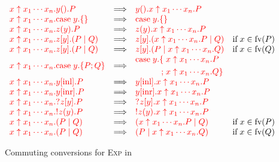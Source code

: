 \begin{figure*}
  \centering
  \(
    \begin{array}{lclr}
      \red{ \expn{x}{x_1 \cdots x_n}\wait{y}P }
      &\Longrightarrow&
      \red{ \wait{y}\expn{x}{x_1 \cdots x_n}P }
      \\
      \red{ \expn{x}{x_1\cdots x_n}\case{y}{}{} }
      &\Longrightarrow&
      \red{ \case{y}{}{} }
      \\
      \red{ \expn{x}{x_1 \cdots x_n}\recv{z}{y}P }
      &\Longrightarrow&
      \red{ \recv{z}{y}\expn{x}{x_1 \cdots x_n}P }
      \\
      \red{ \expn{x}{x_1 \cdots x_n}\send{z}{y}(P \mid Q) }
      &\Longrightarrow&
      \red{ \send{z}{y}(\expn{x}{x_1 \cdots x_n}P \mid Q) }
      &\text{if} \; x \in \text{fv}(P)
      \\
      \red{ \expn{x}{x_1 \cdots x_n}\send{z}{y}(P \mid Q) }
      &\Longrightarrow&
      \red{ \send{z}{y}(P \mid \expn{x}{x_1 \cdots x_n}Q) }
      &\text{if} \; x \in \text{fv}(Q) 
      \\
      \red{ \expn{x}{x_1 \cdots x_n}\case{y}{P}{Q} }
      &\Longrightarrow&
      \!\begin{aligned}
        \red{ \text{case}\;y.}
        \red{ \{\;}& \red{\expn{x}{x_1 \cdots x_n}P}\\
        \red{  ;\;}& \red{\expn{x}{x_1 \cdots x_n}Q\}}
      \end{aligned}
      \\
      \red{ \expn{x}{x_1 \cdots x_n}\inl{y}P }
      &\Longrightarrow&
      \red{ \inl{y}\expn{x}{x_1 \cdots x_n}P }
      \\
      \red{ \expn{x}{x_1 \cdots x_n}\inr{y}P }
      &\Longrightarrow&
      \red{ \inr{y}\expn{x}{x_1 \cdots x_n}P }
      \\
      \red{ \expn{x}{x_1 \cdots x_n}\give{\send{z}{y}}P }
      &\Longrightarrow&
      \red{ \give{\send{z}{y}}\expn{x}{x_1 \cdots x_n}P }
      \\
      \red{ \expn{x}{x_1 \cdots x_n}\take{\recv{z}{y}}P }
      &\Longrightarrow&
      \red{ \take{\recv{z}{y}}\expn{x}{x_1 \cdots x_n}P }
      \\
      \red{ \expn{x}{x_1 \cdots x_n}(P \mid Q) }
      &\Longrightarrow&
      \red{ (\expn{x}{x_1 \cdots x_n}P \mid Q) }
      &\text{if} \; x \in \text{fv}(P) 
      \\
      \red{ \expn{x}{x_1 \cdots x_n}(P \mid Q) }
      &\Longrightarrow&
      \red{ (P \mid \expn{x}{x_1 \cdots x_n}Q) }
      &\text{if} \; x \in \text{fv}(Q) 
    \end{array}
  \)
  \caption{Commuting conversions for \textsc{Exp} in \nodcap}
  \label{fig:nodcap-expn-cc}
\end{figure*}

